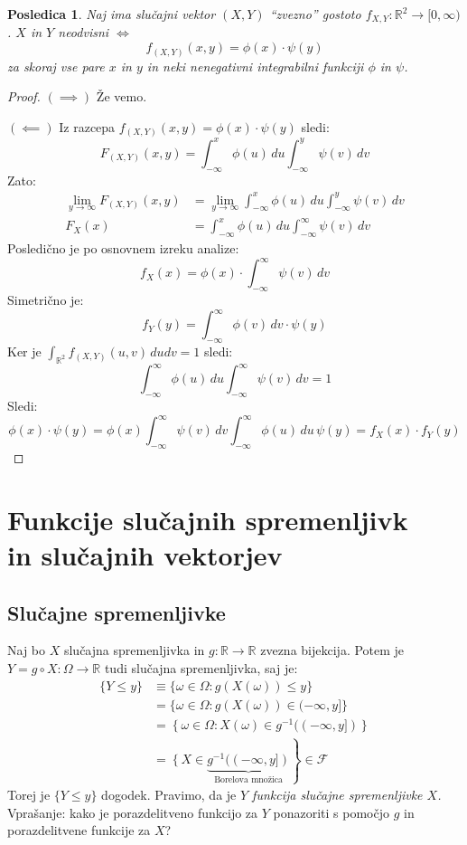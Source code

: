 \documentclass[12pt]{book}
\def\n{\noindent}
\theoremstyle{definition}
\theoremstyle{plain}
\theoremstyle{plain}
\theoremstyle{plain}
\newtheorem{posledica}{Posledica}
\theoremstyle{remark}
\begin{document}
\begin{posledica}
    Naj ima slučajni vektor $(X,Y)$ “zvezno” gostoto $f_{X,Y}: \mathbb{R}^2 \to [0, \infty)$. $X$ in $Y$ neodvisni $\iff$
    $$
    f_{(X, Y)}(x, y)=\phi(x) \cdot \psi(y)
    $$
    za skoraj vse pare $x$ in $y$ in neki nenegativni integrabilni funkciji $\phi$ in $\psi$.
\end{posledica}

\begin{proof}
    $(\implies)$ Že vemo. 

    \n $(\impliedby)$ Iz razcepa $f_{(X, Y)}(x, y)=\phi(x) \cdot \psi(y)$ sledi: 
    $$
    F_{(X, Y)}(x, y)=\int_{-\infty}^x \phi(u) \, d u \int_{-\infty}^y \psi(v) \, d v
    $$
    Zato: 
    $$
    \begin{aligned}
        \lim_{y \to \infty} F_{(X,Y)}(x,y) &= \lim_{y \to \infty} \int_{-\infty}^x \phi(u) \, d u \int_{-\infty}^y \psi(v) \, d v \\
        F_X(x)&=\int_{-\infty}^x \phi(u) \, d u \int_{-\infty}^{\infty} \psi(v) \, d v
    \end{aligned}
    $$
    Posledično je po osnovnem izreku analize: 
    $$
    f_X(x)=\phi(x) \cdot \int_{-\infty}^{\infty} \psi(v) \, d v
    $$
    Simetrično je: 
    $$
    f_Y(y)=\int_{-\infty}^{\infty} \phi(v) \, d v  \cdot \psi(y)
    $$
    Ker je $\int_{\mathbb{R}^2} f_{(X, Y)}(u, v) \, d u d v=1$ sledi:
    $$
    \int_{-\infty}^{\infty} \phi(u) \, d u \int_{-\infty}^{\infty} \psi(v) \, d v=1
    $$
    Sledi: 
    $$
    \phi(x) \cdot \psi(y)=\phi(x) \int_{-\infty}^{\infty} \psi(v) \, d v  \int_{-\infty}^{\infty} \phi(u) \, d u \, \psi(y)=f_X(x) \cdot f_Y(y)
    $$
\end{proof}

\chapter[Funkcije slučajnih spremenljivk in slučajnih vektorjev]{Funkcije slučajnih spremenljivk \\ in slučajnih vektorjev}

\section{Slučajne spremenljivke}

Naj bo $X$ slučajna spremenljivka in $g: \mathbb{R} \to \mathbb{R}$ zvezna bijekcija. Potem je $Y= g \circ X: \Omega \rightarrow \mathbb{R}$ tudi slučajna spremenljivka, saj je:
$$
\begin{aligned}
    \{Y \leq y\} &\equiv\{\omega \in \Omega: g(X(\omega)) \leq y\} \\
    & =\{\omega \in \Omega: g(X(\omega)) \in(-\infty, y]\} \\
    & =\left\{\omega \in \Omega: \right. X(\omega) \in g^{-1} \left. ((-\infty, y])\right\} \\
    & =\left\{X \in \right. \underbrace{g^{-1}((-\infty, y])}_{\text{Borelova množica}}\left. \right\} \in \mathcal{F}
\end{aligned}
$$
Torej je $\{Y \leq y\}$ dogodek. Pravimo, da je \emph{$Y$ funkcija slučajne spremenljivke $X$.} Vprašanje: kako je porazdelitveno funkcijo za $Y$ ponazoriti s pomočjo $g$ in porazdelitvene funkcije za $X$? 
\end{document}
